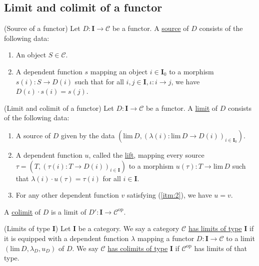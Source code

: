 
\subsection{Limit and colimit of a functor}

\begin{definition}{(Source of a functor)}
Let $D : \mathbf{I} \rightarrow \mathcal{C}$ be a functor. A \ul{source} of $D$ consists of the following data:
\begin{enumerate}
\renewcommand{\labelenumi}{(\theenumi)}
\item An object $S \in \mathcal{C}$.
\item A dependent function $s$ mapping an object $i \in \mathbf{I}_{0}$ to a morphism
$s(i) : S \rightarrow D(i)$ such that for all $i, j \in \mathbf{I}, \iota : i \rightarrow j$, we have $D(\iota) \cdot s(i) = s(j)$.
\end{enumerate}
\end{definition}

\begin{definition}{(Limit and colimit of a functor)}
Let $D : \mathbf{I} \rightarrow \mathcal{C}$ be a functor. A \ul{limit} of $D$ consists of the
following data:
\begin{enumerate}
\renewcommand{\labelenumi}{(\theenumi)}
\item A source of $D$ given by the data $(\mathrm{lim}\, D, (\lambda(i) : \mathrm{lim}\, D \rightarrow D(i))_{i\in\mathbf{I}_{0}})$.
\item A dependent function $u$, called the \ul{lift}, mapping every source $\tau = (T, (\tau(i) : T \rightarrow D(i))_{i \in \mathbf{I}})$ to a
morphism $u(\tau) : T \rightarrow \mathrm{lim}\, D$ such that $\lambda(i) \cdot u(\tau) = \tau(i)$ for all $i \in \mathbf{I}$.\label{itm:2}
\item For any other dependent function $v$ satisfying (\ref{itm:2}), we have $u = v$.
\end{enumerate}
A \ul{colimit} of $D$ is a limit of $D' : \mathbf{I} \rightarrow \mathcal{C}^{\mathrm{op}}$.
\end{definition}

\begin{definition}{(Limits of type \textbf{I})}
Let $\mathbf{I}$ be a category. We say a category $\mathcal{C}$ \ul{has limits of type} $\mathbf{I}$ if it is
equipped with a dependent function $\lambda$ mapping a functor $D : \mathbf{I} \rightarrow \mathcal{C}$ to a limit
$(\mathrm{lim}\, D, \lambda_{D}, u_{D})$ of $D$.
We say $\mathcal{C}$ \ul{has colimits of type} $\mathbf{I}$ if $\mathcal{C}^{\mathrm{op}}$ has limits of that type.
\end{definition}

